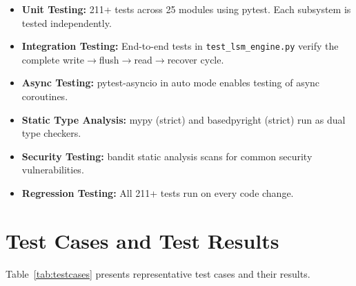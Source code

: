 \documentclass[oneside,a4paper,12pt]{book}
\begin{document}
\begin{itemize}[leftmargin=2em]
    \item \textbf{Unit Testing:} 211+ tests across 25 modules using pytest. Each subsystem is tested independently.
    \item \textbf{Integration Testing:} End-to-end tests in \texttt{test\_lsm\_engine.py} verify the complete write$\rightarrow$flush$\rightarrow$read$\rightarrow$recover cycle.
    \item \textbf{Async Testing:} pytest-asyncio in auto mode enables testing of async coroutines.
    \item \textbf{Static Type Analysis:} mypy (strict) and basedpyright (strict) run as dual type checkers.
    \item \textbf{Security Testing:} bandit static analysis scans for common security vulnerabilities.
    \item \textbf{Regression Testing:} All 211+ tests run on every code change.
\end{itemize}

\section{Test Cases and Test Results}

Table~\ref{tab:testcases} presents representative test cases and their results.
\end{document}
